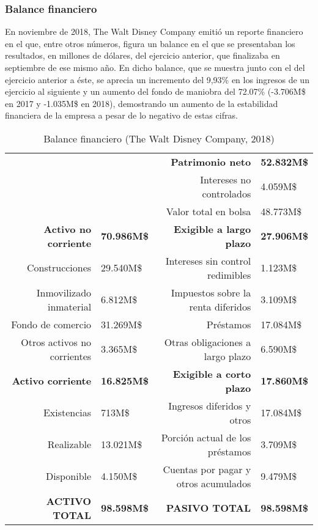 \subsubsection{Balance financiero}

En noviembre de 2018, The Walt Disney Company emitió un reporte financiero en el que, entre otros números, figura un balance en el que se presentaban los resultados, en millones de dólares, del ejercicio anterior, que finalizaba en septiembre de ese mismo año. En dicho balance, que se muestra junto con el del ejercicio anterior a éste, se aprecia un incremento del 9,93\% en los ingresos de un ejercicio al siguiente y un aumento del fondo de maniobra del 72.07\% (-3.706M\$ en 2017 y -1.035M\$ en 2018), demostrando un aumento de la estabilidad financiera de la empresa a pesar de lo negativo de estas cifras.

\begin{table}[]
\centering
\begin{tabular}{rlrl}
 & & \textbf{Patrimonio neto} & \textbf{52.832M\$} \\
 & & Intereses no controlados & 4.059M\$ \\
 & & Valor total en bolsa & 48.773M\$ \\
\textbf{Activo no corriente} & \textbf{70.986M\$}& \textbf{Exigible a largo plazo} & \textbf{27.906M\$} \\
Construcciones & 29.540M\$ & Intereses sin control redimibles & 1.123M\$ \\
Inmovilizado inmaterial & 6.812M\$ & Impuestos sobre la renta diferidos & 3.109M\$ \\
Fondo de comercio & 31.269M\$ & Préstamos & 17.084M\$ \\
Otros activos no corrientes & 3.365M\$ & Otras obligaciones a largo plazo & 6.590M\$ \\
\textbf{Activo corriente} & \textbf{16.825M\$} & \textbf{Exigible a corto plazo} & \textbf{17.860M\$} \\
Existencias & 713M\$ & Ingresos diferidos y otros & 17.084M\$ \\
Realizable & 13.021M\$ & Porción actual de los préstamos & 3.709M\$ \\
Disponible & 4.150M\$ & Cuentas por pagar y otros acumulados & 9.479M\$ \\
\textbf{ACTIVO TOTAL} & \textbf{98.598M\$} & \textbf{PASIVO TOTAL} & \textbf{98.598M\$}
\end{tabular}
\caption{\label{fig:frog}Balance financiero (The Walt Disney Company, 2018)}
\end{table}